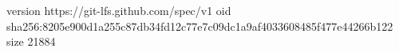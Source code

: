 version https://git-lfs.github.com/spec/v1
oid sha256:8205e900d1a255c87db34fd12c77e7c09dc1a9af4033608485f477e44266b122
size 21884

